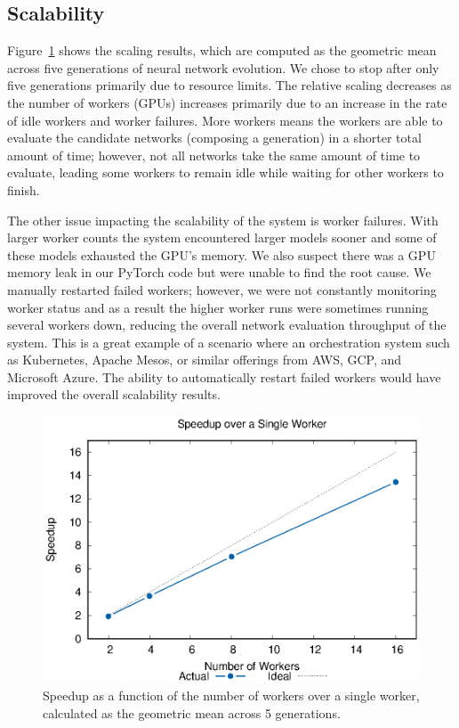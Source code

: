 \documentclass[conference]{IEEEtran}
\begin{document}
\subsection{Scalability}
Figure~\ref{fig:scale} shows the scaling results, which are computed as the
geometric mean across five generations of neural network evolution. We chose to
stop after only five generations primarily due to resource limits.  The relative
scaling decreases as the number of workers (GPUs) increases primarily due to an
increase in the rate of idle workers and worker failures. More workers means the
workers are able to evaluate the candidate networks (composing a generation) in
a shorter total amount of time; however, not all networks take the same amount
of time to evaluate, leading some workers to remain idle while waiting for other
workers to finish.

The other issue impacting the scalability of the system is worker
failures. With larger worker counts the system encountered larger models
sooner and some of these models exhausted the GPU's memory. We also
suspect there was a GPU memory leak in our PyTorch code but were unable
to find the root cause. We manually restarted failed workers; however,
we were not constantly monitoring worker status and as a result the higher
worker runs were sometimes running several workers down, reducing the overall
network evaluation throughput of the system. This is a great
example of a scenario where an orchestration system such as Kubernetes,
Apache Mesos, or similar offerings from AWS, GCP, and Microsoft Azure.
The ability to automatically restart failed workers would have improved
the overall scalability results.

\begin{figure}
  \centering
  \includegraphics[width=\columnwidth]{result/output/rates}
  \caption{Speedup as a function of the number of workers over a single worker,
    calculated as the geometric mean across 5 generations.}
  \label{fig:scale}
\end{figure}
\end{document}
